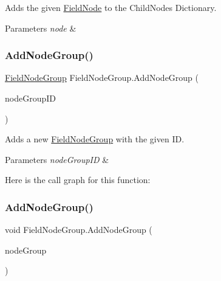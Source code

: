 Adds the given \hyperlink{class_field_node}{Field\+Node} to the Child\+Nodes Dictionary. 


\begin{DoxyParams}{Parameters}
{\em node} & \\
\hline
\end{DoxyParams}
\mbox{\label{class_field_node_group_a573db062478581073b88fff7c8f2c421}} 
\subsubsection{\texorpdfstring{Add\+Node\+Group()}{AddNodeGroup()}\hspace{0.1cm}{\footnotesize\ttfamily [1/2]}}
{\footnotesize\ttfamily \hyperlink{class_field_node_group}{Field\+Node\+Group} Field\+Node\+Group.\+Add\+Node\+Group (\begin{DoxyParamCaption}\item[{string}]{node\+Group\+ID }\end{DoxyParamCaption})}



Adds a new \hyperlink{class_field_node_group}{Field\+Node\+Group} with the given ID. 


\begin{DoxyParams}{Parameters}
{\em node\+Group\+ID} & \\
\hline
\end{DoxyParams}
Here is the call graph for this function\+:
\mbox{\label{class_field_node_group_ade2f0d484ad7c38ac0000d1ea7ecf405}} 
\subsubsection{\texorpdfstring{Add\+Node\+Group()}{AddNodeGroup()}\hspace{0.1cm}{\footnotesize\ttfamily [2/2]}}
{\footnotesize\ttfamily void Field\+Node\+Group.\+Add\+Node\+Group (\begin{DoxyParamCaption}\item[{\hyperlink{class_field_node_group}{Field\+Node\+Group}}]{node\+Group }\end{DoxyParamCaption})}



